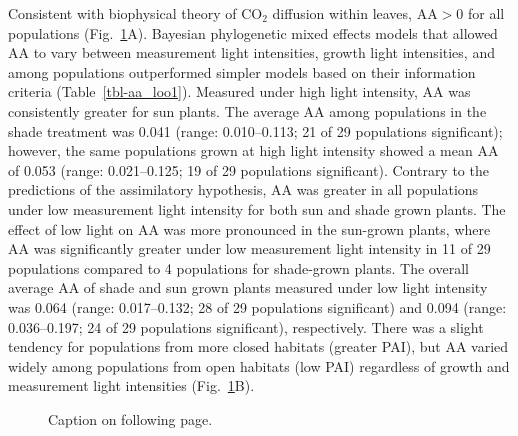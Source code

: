 \documentclass[
  letterpaper,
  DIV=11,
  numbers=noendperiod]{scrartcl}
\newcommand{\aax}{$\mathrm{AA}$}
\newcommand{\aay}{\mathrm{AA}}
\begin{document}
Consistent with biophysical theory of CO\(_2\) diffusion within leaves,
\(\aay{} > 0\) for all populations (Fig.~\ref{fig-aa}A). Bayesian
phylogenetic mixed effects models that allowed \aax{} to vary between
measurement light intensities, growth light intensities, and among
populations outperformed simpler models based on their information
criteria (Table~\ref{tbl-aa_loo1}). Measured under high light intensity,
\aax{} was consistently greater for sun plants. The average \aax{} among
populations in the shade treatment was 0.041 (range: 0.010--0.113; 21 of
29 populations significant); however, the same populations grown at high
light intensity showed a mean \aax{} of 0.053 (range: 0.021--0.125; 19
of 29 populations significant). Contrary to the predictions of the
assimilatory hypothesis, \aax{} was greater in all populations under low
measurement light intensity for both sun and shade grown plants. The
effect of low light on \aax{} was more pronounced in the sun-grown
plants, where \aax{} was significantly greater under low measurement
light intensity in 11 of 29 populations compared to 4 populations for
shade-grown plants. The overall average \aax{} of shade and sun grown
plants measured under low light intensity was 0.064 (range:
0.017--0.132; 28 of 29 populations significant) and 0.094 (range:
0.036--0.197; 24 of 29 populations significant), respectively. There was
a slight tendency for populations from more closed habitats (greater
PAI), but \aax{} varied widely among populations from open habitats (low
PAI) regardless of growth and measurement light intensities
(Fig.~\ref{fig-aa}B).

\begin{figure}


\caption{\label{fig-aa}Caption on following page.}

\end{figure}%

\addtocounter{figure}{-1}
\end{document}
